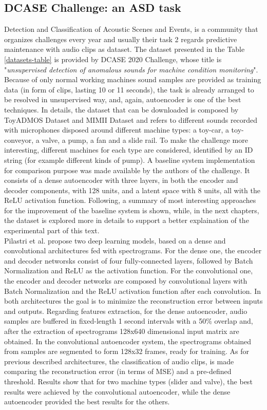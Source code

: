 \subsection{DCASE Challenge: an ASD task}
Detection and Classification of Acoustic Scenes and Events, is a community that organizes challenges every year and usually their task 2 regards predictive maintenance with audio clips as dataset. The dataset presented in the Table \ref{datasets-table} is provided by DCASE 2020 Challenge, whose title is "\textit{unsupervised detection of anomalous sounds for machine condition monitoring}". Because of only normal working machines sound samples are provided as training data (in form of clips, lasting 10 or 11 seconds), the task is already arranged to be resolved in unsupervised way, and, again, autoencoder is one of the best techniques. In details, the dataset that can be downloaded is composed by ToyADMOS Dataset and MIMII Dataset \cite{DCASE} and refers to different sounds recorded with microphones disposed around different machine types: a toy-car, a toy-conveyor, a valve, a pump, a fan and a slide rail. To make the challenge more interesting, different machines for each type are considered, identified by an ID string (for example different kinds of pump). A baseline system implementation for comparison purpose was made available by the authors of the challenge. It consists of a dense autoencoder with three layers, in both the encoder and decoder components, with 128 units, and a latent space with 8 units, all with the ReLU activation function. Following, a summary of most interesting approaches for the improvement of the baseline system is shown, while, in the next chapters, the dataset is explored more in details to support a better explaination of the experimental part of this text.\\
Pilastri et al. \cite{15DeepDenseConvAE} propose two deep learning models, based on a dense and convolutional architectures fed with spectrograms. For the dense one, the encoder and decoder networsks consist of four fully-connected layers, followed by Batch Normalization and ReLU as the activation function. For the convolutional one, the encoder and decoder networks are composed by convolutional layers with Batch Normalization and the ReLU activation function after each convolution. In both architectures the goal is to minimize the reconstruction error between inputs and outputs. Regarding features extraction, for the dense autoencoder, audio samples are buffered in fixed-length 1 second intervals with a 50\% overlap and, after the extraction of spectrograms 128x640 dimensional input matrix are obtained. In the convolutional autoencoder system, the spectrograms obtained from samples are segmented to form 128x32 frames, ready for training. As for previous described architectures, the classification of audio clips, is made comparing the reconstruction error (in terms of MSE) and a pre-defined threshold. Results show that for two machine types (slider and valve), the best results were achieved by the convolutional autoencoder, while the dense autoencoder provided the best results for the others.\\

